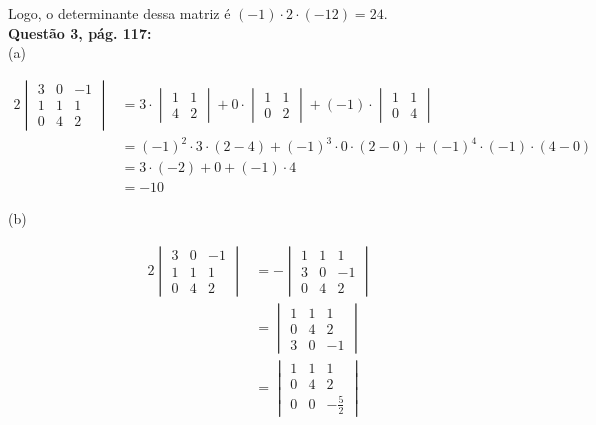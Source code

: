 \documentclass[a4paper,12pt]{article}
\begin{document}
Logo, o determinante dessa matriz é $(-1) \cdot 2 \cdot (-12) = 24$.\\

\textbf{Questão 3, pág. 117:}\\

(a)

\begin{alignat*}{2}
  \begin{vmatrix}
      3 &  0 &  -1\\
      1 & 1  & 1\\
      0 &  4 &  2
  \end{vmatrix}
  &= 3 \cdot
  \begin{vmatrix}
    1  & 1\\
    4 &  2
  \end{vmatrix} +
  0 \cdot
  \begin{vmatrix}
    1  & 1\\
    0 &  2
  \end{vmatrix} +
  (-1) \cdot
  \begin{vmatrix}
    1  & 1\\
    0 &  4
  \end{vmatrix}
  \\
  &= (-1)^{2} \cdot 3 \cdot (2 - 4) + (-1)^{3} \cdot 0 \cdot (2 - 0) + (-1)^{4} \cdot (-1) \cdot (4 - 0)
  \\
  &= 3 \cdot (-2) + 0 + (-1) \cdot 4\\
  &= -10
\end{alignat*}

\newpage
(b)

\begin{alignat*}{2}
  \begin{vmatrix}
      3 &  0 &  -1\\
      1 & 1  & 1\\
      0 &  4 &  2
  \end{vmatrix}
  &=
  -\begin{vmatrix}
      1 & 1  & 1\\
      3 &  0 &  -1\\
      0 &  4 &  2
  \end{vmatrix}
  \\
  &=
  \begin{vmatrix}
      1 & 1  & 1\\
      0 &  4 &  2\\
      3 &  0 &  -1
  \end{vmatrix}
  \\
  &=
  \begin{vmatrix}
      1 & 1  & 1\\
      0 &  4 &  2\\
      0 &  0 &  -\frac{5}{2}
  \end{vmatrix}
\end{alignat*}
\end{document}
